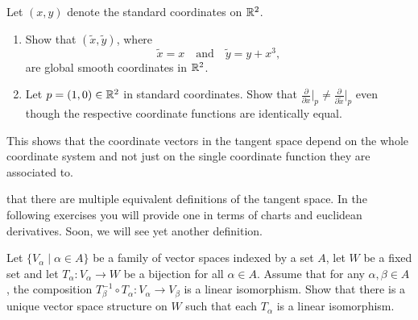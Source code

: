 \begin{exercise}
  Let $(x,y)$ denote the standard coordinates on $\mathbb{R}^2$.
  \begin{enumerate}
    \item Show that $(\widetilde{x}, \widetilde{y})$, where
          \begin{equation}
            \widetilde{x} = x
            \quad\mbox{and}\quad
            \widetilde{y} = y + x^3,
          \end{equation}
          are global smooth coordinates in $\mathbb{R}^2$.
    \item Let $p=(1,0)\in\mathbb{R}^2$ in standard coordinates.
          Show that $\frac{\partial}{\partial x}\Big|_p \neq \frac{\partial}{\partial \widetilde x}\Big|_p$ even though the respective coordinate functions are identically equal.
  \end{enumerate}
  This shows that the coordinate vectors in the tangent space depend on the whole coordinate system and not just on the single coordinate function they are associated to.
\end{exercise}

 that there are multiple equivalent definitions of the tangent space. In the following exercises you will provide one in terms of charts and euclidean derivatives.
Soon, we will see yet another definition.

\begin{exercise}\label{exe:vsstruct}
  Let $\{V_\alpha \mid \alpha\in A\}$ be a family of vector spaces indexed by a set $A$, let $W$ be a fixed set and let $T_\alpha: V_\alpha\to W$ be a bijection for all $\alpha\in A$.
  Assume that for any $\alpha, \beta \in A$, the composition $T_\beta^{-1}\circ T_\alpha : V_\alpha \to V_\beta$ is a linear isomorphism.
  Show that there is a unique vector space structure on $W$ such that each $T_\alpha$ is a linear isomorphism.
\end{exercise}

